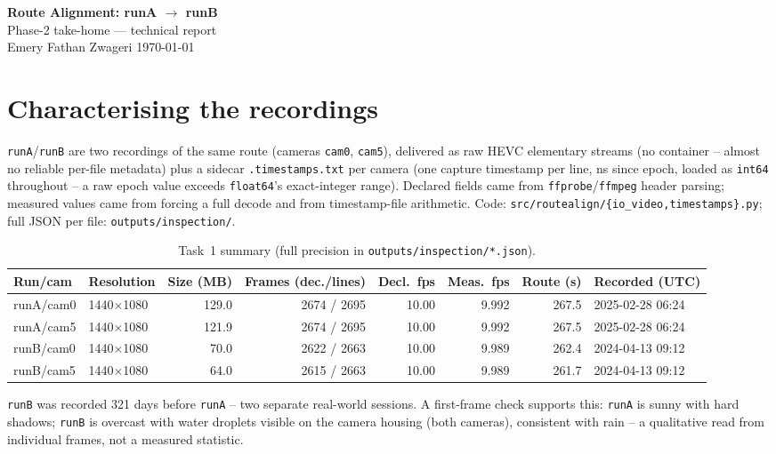 \documentclass[11pt,a4paper]{article}
\begin{document}
\begin{center}
  {\LARGE\bfseries Route Alignment: runA $\to$ runB}\\[0.25em]
  {\large Phase-2 take-home --- technical report }\\[0.2em]
  \small Emery Fathan Zwageri \quad\textbullet\quad \today
\end{center}

\section{Characterising the recordings}
\label{sec:t1}

\texttt{runA}/\texttt{runB} are two recordings of the same route (cameras \texttt{cam0},
\texttt{cam5}), delivered as raw HEVC elementary streams (no container -- almost no reliable
per-file metadata) plus a sidecar \texttt{.timestamps.txt} per camera (one capture timestamp per
line, ns since epoch, loaded as \texttt{int64} throughout -- a raw epoch value exceeds
\texttt{float64}'s exact-integer range). Declared fields came from \texttt{ffprobe}/\texttt{ffmpeg}
header parsing; measured values came from forcing a full decode and from timestamp-file
arithmetic. Code: \texttt{src/routealign/\{io\_video,timestamps\}.py}; full JSON per file:
\texttt{outputs/inspection/}.

\begin{table}[H]
  \centering
  \footnotesize
  \begin{tabular}{l l r r r r r l}
    \toprule
    Run/cam & Resolution & Size (MB) & Frames (dec./lines) & Decl.\ fps & Meas.\ fps & Route (s) & Recorded (UTC) \\
    \midrule
    runA/cam0 & 1440$\times$1080 & 129.0 & 2674 / 2695 & 10.00 & 9.992 & 267.5 & 2025-02-28 06:24 \\
    runA/cam5 & 1440$\times$1080 & 121.9 & 2674 / 2695 & 10.00 & 9.992 & 267.5 & 2025-02-28 06:24 \\
    runB/cam0 & 1440$\times$1080 & 70.0  & 2622 / 2663 & 10.00 & 9.989 & 262.4 & 2024-04-13 09:12 \\
    runB/cam5 & 1440$\times$1080 & 64.0  & 2615 / 2663 & 10.00 & 9.989 & 261.7 & 2024-04-13 09:12 \\
    \bottomrule
  \end{tabular}
  \caption{Task~1 summary (full precision in \texttt{outputs/inspection/*.json}).}
  \label{tab:t1}
\end{table}

\texttt{runB} was recorded 321 days before \texttt{runA} -- two separate real-world sessions.
A first-frame check supports this: \texttt{runA} is sunny with hard shadows; \texttt{runB} is
overcast with water droplets visible on the camera housing (both cameras), consistent with rain --
a qualitative read from individual frames, not a measured statistic.
\end{document}
